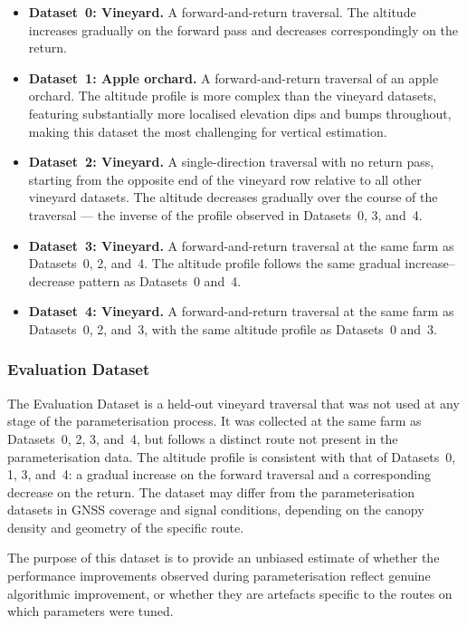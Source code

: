 \begin{itemize}
  \item \textbf{Dataset~0: Vineyard.} A forward-and-return traversal. The altitude increases gradually on the forward pass and decreases correspondingly on the return.
  \item \textbf{Dataset~1: Apple orchard.} A forward-and-return traversal of an apple orchard. The altitude profile is more complex than the vineyard datasets, featuring substantially more localised elevation dips and bumps throughout, making this dataset the most challenging for vertical estimation.
  \item \textbf{Dataset~2: Vineyard.} A single-direction traversal with no return pass, starting from the opposite end of the vineyard row relative to all other vineyard datasets. The altitude decreases gradually over the course of the traversal — the inverse of the profile observed in Datasets~0, 3, and~4.
  \item \textbf{Dataset~3: Vineyard.} A forward-and-return traversal at the same farm as Datasets~0, 2, and~4. The altitude profile follows the same gradual increase--decrease pattern as Datasets~0 and~4.
  \item \textbf{Dataset~4: Vineyard.} A forward-and-return traversal at the same farm as Datasets~0, 2, and~3, with the same altitude profile as Datasets~0 and~3.
\end{itemize}

\subsubsection{Evaluation Dataset}

The Evaluation Dataset is a held-out vineyard traversal that was not used at any stage of the parameterisation process. It was collected at the same farm as Datasets~0, 2, 3, and~4, but follows a distinct route not present in the parameterisation data. The altitude profile is consistent with that of Datasets~0, 1, 3, and~4: a gradual increase on the forward traversal and a corresponding decrease on the return. The dataset may differ from the parameterisation datasets in GNSS coverage and signal conditions, depending on the canopy density and geometry of the specific route.

The purpose of this dataset is to provide an unbiased estimate of whether the performance improvements observed during parameterisation reflect genuine algorithmic improvement, or whether they are artefacts specific to the routes on which parameters were tuned.

